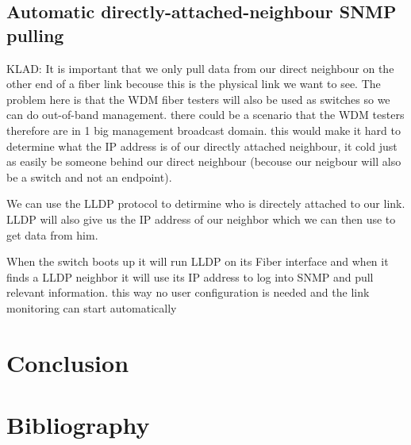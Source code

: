 \documentclass{article}
\begin{document}
\subsection{Automatic directly-attached-neighbour SNMP pulling}
KLAD:
It is important that we only pull data from our direct neighbour on the other end of a fiber link becouse this is the physical link we want to see. The problem here is that the WDM fiber testers will also be used as switches so we can do out-of-band management. there could be a scenario that the WDM testers therefore are in 1 big management broadcast domain. this would make it hard to determine what the IP address is of our directly attached neighbour, it cold just as easily be someone behind our direct neighbour (becouse our neigbour will also be a switch and not an endpoint).

We can use the LLDP protocol to detirmine who is directely attached to our link. LLDP will also give us the IP address of our neighbor which we can then use to get data from him.

When the switch boots up it will run LLDP on its Fiber interface and when it finds a LLDP neighbor it will use its IP address to log into SNMP and pull relevant information. this way no user configuration is needed and the link monitoring can start automatically


\section{Conclusion}

\section{Bibliography}


\end{document}
